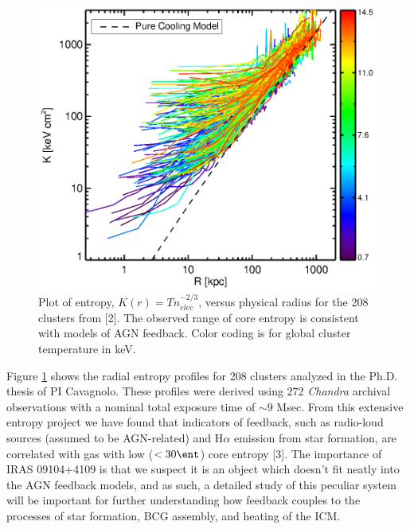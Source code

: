 \documentclass[letterpaper,11pt,twocolumn]{article}
\begin{document}
\begin{figure}
\begin{center}
\includegraphics*[width=\columnwidth, trim=28mm 10mm 30mm 17mm, clip]{splots}
\caption{
Plot of entropy, $K(r) = Tn_{elec}^{-2/3}$, versus physical radius for
the 208 clusters from [2]. The observed range of core
entropy is consistent with models of AGN feedback. Color coding is
for global cluster temperature in keV.
}
\label{fig:ent}
\end{center}
\end{figure}

Figure \ref{fig:ent} shows the radial entropy profiles for 208
clusters analyzed in the Ph.D. thesis of PI Cavagnolo. These
profiles were derived using 272 {\it{Chandra}} archival observations
with a nominal total exposure time of $\sim9$ Msec. From this extensive entropy project we have found
that indicators of feedback, such as radio-loud sources (assumed to be
AGN-related) and H$\alpha$ emission from star formation, are correlated
with gas with low ($< 30 \ent$) core entropy [3]. The
importance of IRAS 09104+4109 is that we suspect it is an object which
doesn't fit neatly into the AGN feedback models, and as such, a
detailed study of this peculiar system will be important for further
understanding how feedback couples to the processes of star formation,
BCG assembly, and heating of the ICM.\\
\end{document}
